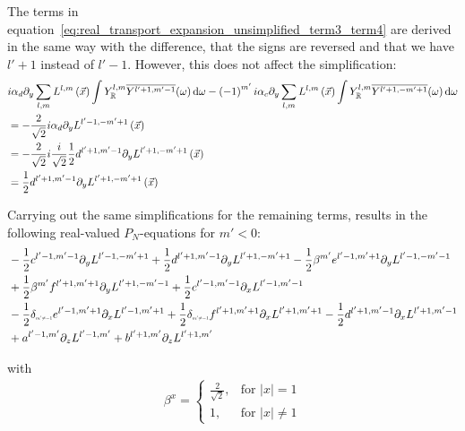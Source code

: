 \documentclass[10pt]{scrartcl}
\begin{document}
The terms in equation~\ref{eq:real_transport_expansion_unsimplified_term3_term4} are derived in the same way with the difference, that the signs are reversed and that we have $l'+1$ instead of $l'-1$. However, this does not affect the simplification:
\begin{align*}
&i\alpha_d\partial_y\sum_{l,m}L^{l,m}\left (\vec{x}\right)\int{Y_{\mathbb{R}}^{l,m}\overline{Y^{l'+1, m'-1}}(\omega )\,\mathrm{d}\omega}
-\left({-1}\right)^{m'}i\alpha_c\partial_y\sum_{l,m}L^{l,m}\left (\vec{x}\right)\int{Y_{\mathbb{R}}^{l,m}\overline{Y^{l'+1, -m'+1}}(\omega )\,\mathrm{d}\omega}
\\
&=-\frac{2}{\sqrt{2}}i
\alpha_d\partial_y
L^{l'-1,-m'+1}\left (\vec{x}\right)
\\
&=-\frac{2}{\sqrt{2}}i
\frac{i}{\sqrt{2}}\frac{1}{2}d^{{l'+1,m'-1}}
\partial_y
L^{l'+1,-m'+1}\left (\vec{x}\right)
\\
&=
\frac{1}{2}d^{{l'+1,m'-1}}
\partial_y
L^{l'+1,-m'+1}\left (\vec{x}\right)
\end{align*}

Carrying out the same simplifications for the remaining terms, results in the following real-valued $P_N$-equations for $m'<0$:
\begin{align*}
&-\frac{1}{2}c^{{l'-1,m'-1}}
\partial_y
L^{l'-1,-m'+1}
+\frac{1}{2}d^{{l'+1,m'-1}}
\partial_y
L^{l'+1,-m'+1}
-\frac{1}{2}\beta^{m'}e^{{l'-1,m'+1}}
\partial_y
L^{l'-1,-m'-1}
\\&
+\frac{1}{2}\beta^{m'}f^{{l'+1,m'+1}}
\partial_y
L^{l'+1,-m'-1}
+\frac{1}{2}c^{{l'-1,m'-1}}
\partial_x
L^{l'-1,m'-1}
\\&
-\frac{1}{2}\delta_{\scaleto{m'\neq -1}{4pt}}e^{{l'-1,m'+1}}
\partial_x
L^{l'-1,m'+1}
+\frac{1}{2}\delta_{\scaleto{m'\neq -1}{4pt}}f^{{l'+1,m'+1}}
\partial_x
L^{l'+1,m'+1}
-\frac{1}{2}d^{{l'+1,m'-1}}
\partial_x
L^{l'+1,m'-1}
\\&
+a^{{l'-1,m'}}
\partial_z
L^{l'-1,m'}
+b^{{l'+1,m'}}
\partial_z
L^{l'+1,m'}
\end{align*}

with
\begin{align}
\label{eq:real_sh_basis}
\beta^{x}=
\left\{
\begin{array}{lr}
\frac{2}{\sqrt{2}}, & \text{for } \vert x\vert = 1\\
1, & \text{for } \vert x\vert \neq 1
\end{array}
\right.
\end{align}
\end{document}
